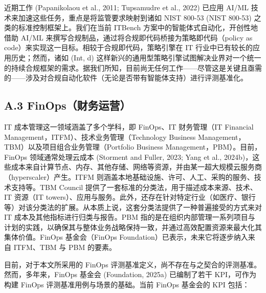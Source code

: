\documentclass[10pt,UTF8,fontset=fandol]{ctexart}
\begin{document}
近期工作 (Papanikolaou et al., 2011; Tupsamudre et al., 2022) 已应用 AI/ML 技术来加速这些任务，重点是将监管要求映射到诸如 NIST 800-53 (NIST 800-53) 之类的标准控制框架上。我们在当前 ITBench 方案中的智能体式自动化，开创性地借助 AI/ML 来撰写合规制品，通过将合规即代码桥接为策略即代码（policy as code）来实现这一目标。相较于合规即代码，策略引擎在 IT 行业中已有较长的应用历史；然而，诸如 (Int, d) 这样新兴的通用型策略引擎试图解决业界对一个统一的持续合规框架的需求。据我们所知，目前尚无任何工作——尽管这是关键且亟需的——涉及对合规自动化软件（无论是否带有智能体支持）进行评测基准化。

\subsection{A.3 FinOps（财务运营）}

IT 成本管理这一领域涵盖了多个学科，即 FinOps、IT 财务管理（IT Financial Management，ITFM）、技术业务管理（Technology Business Management，TBM）以及项目组合业务管理（Portfolio Business Management，PBM）。目前，FinOps 领域通常处理云成本 (Storment and Fuller, 2023; Yang et al., 2024b)，这些成本来自计算节点、内存、其他存储、网络等资源，并由某一超大规模云服务商（hyperscaler）产生。ITFM 则涵盖本地基础设施、许可、人工、采购的服务、技术支持等。TBM Council 提供了一套标准的分类法，用于描述成本来源、技术、IT 资源（IT towers）、应用与服务。此外，还存在针对特定行业（如医疗、银行等）对该分类法的扩展。从本质上说，这套分类法提供了一种普遍接受的方式来对 IT 成本及其他指标进行归类与报告。PBM 指的是在组织内部管理一系列项目与计划的实践，以确保其与整体业务战略保持一致，并通过高效配置资源来最大化其集体价值。FinOps 基金会（FinOps Foundation）已表示，未来它将逐步纳入来自 ITFM、TBM 与 PBM 的要素。

目前，对于本文所采用的 FinOps 评测基准定义，尚不存在与之契合的评测基准。然而，多年来，FinOps 基金会 (Foundation, 2025a) 已编制了若干 KPI，可作为构建 FinOps 评测基准用例与场景的基础。当前 FinOps 基金会的 KPI 包括：
\end{document}
